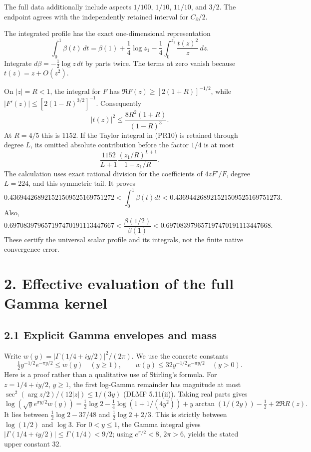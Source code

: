 \documentclass[10pt]{article}
\begin{document}
The full data additionally include aspects \(1/100\), \(1/10\), \(11/10\), and \(3/2\). The endpoint agrees with the independently retained interval for \(C_\partial/2\).

The integrated profile has the exact one-dimensional representation \[
 \boxed{\int_0^1\beta(t)\,dt
 =\beta(1)+\frac14\log z_1
 -\frac14\int_0^{z_1}\frac{t(z)^2}{z}\,dz.}
 \tag{PR10}
\] Integrate \(d\beta=-\frac12\log z\,dt\) by parts twice. The terms at zero vanish because \(t(z)=z+O(z^2)\).

On \(|z|=R<1\), the integral for \(F\) has \(\Re F(z)\ge[2(1+R)]^{-1/2}\), while \(|F'(z)|\le[2(1-R)^{3/2}]^{-1}\). Consequently \[
 |t(z)|^2\le\frac{8R^2(1+R)}{(1-R)^3}.
\] At \(R=4/5\) this is \(1152\). If the Taylor integral in (PR10) is retained through degree \(L\), its omitted absolute contribution before the factor \(1/4\) is at most \[
 \frac{1152}{L+1}\frac{(z_1/R)^{L+1}}{1-z_1/R}.
 \tag{PR11}
\] The calculation uses exact rational division for the coefficients of \(4zF'/F\), degree \(L=224\), and this symmetric tail. It proves \[
 \boxed{0.436944268921521509525169751272
 <\int_0^1\beta(t)dt
 <0.436944268921521509525169751273.}
 \tag{PR12}
\] Also, \[
 \boxed{0.697083979657197470191113447667
 <\frac{\beta(1/2)}{\beta(1)}
 <0.697083979657197470191113447668.}
 \tag{PR13}
\] These certify the universal scalar profile and its integrals, not the finite native convergence error.

\section{2. Effective evaluation of the full Gamma kernel}\label{effective-evaluation-of-the-full-gamma-kernel}

\subsection{2.1 Explicit Gamma envelopes and mass}\label{explicit-gamma-envelopes-and-mass}

Write \(w(y)=|\Gamma(1/4+iy/2)|^2/(2\pi)\). We use the concrete constants \[
 \boxed{\tfrac12 y^{-1/2}e^{-\pi y/2}\le w(y)\quad(y\ge1),
 \qquad w(y)\le32y^{-1/2}e^{-\pi y/2}\quad(y>0).}
 \tag{HK1}
\] Here is a proof rather than a qualitative use of Stirling's formula. For \(z=1/4+iy/2\), \(y\ge1\), the first log-Gamma remainder has magnitude at most \(\sec^2(\arg z/2)/(12|z|)\le1/(3y)\) (DLMF 5.11(ii)). Taking real parts gives \[
 \log(\sqrt y e^{\pi y/2}w(y))
 =\tfrac12\log2-\tfrac14\log(1+1/(4y^2))
 +y\arctan(1/(2y))-\tfrac12+2\Re R(z).
\] It lies between \(\tfrac12\log2-37/48\) and \(\tfrac12\log2+2/3\). This is strictly between \(\log(1/2)\) and \(\log3\). For \(0<y\le1\), the Gamma integral gives \(|\Gamma(1/4+iy/2)|\le\Gamma(1/4)<9/2\); using \(e^{\pi/2}<8\), \(2\pi>6\), yields the stated upper constant 32.
\end{document}
